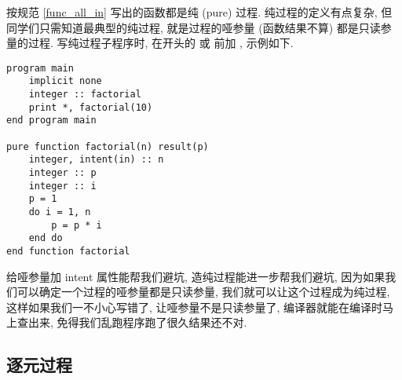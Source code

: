 按规范 \ref{func_all_in} 写出的函数都是纯 (pure) 过程. 纯过程的定义有点复杂, 但同学们只需知道最典型的纯过程, 就是过程的哑参量 (函数结果不算) 都是只读参量的过程. 写纯过程子程序时, 在开头的  或  前加 , 示例如下.
\begin{lstlisting}
program main
    implicit none
    integer :: factorial
    print *, factorial(10)
end program main

pure function factorial(n) result(p)
    integer, intent(in) :: n
    integer :: p
    integer :: i 
    p = 1
    do i = 1, n
        p = p * i
    end do
end function factorial
\end{lstlisting}
给哑参量加 intent 属性能帮我们避坑, 造纯过程能进一步帮我们避坑, 因为如果我们可以确定一个过程的哑参量都是只读参量, 我们就可以让这个过程成为纯过程, 这样如果我们一不小心写错了, 让哑参量不是只读参量了, 编译器就能在编译时马上查出来, 免得我们乱跑程序跑了很久结果还不对. 

\subsection{逐元过程}\label{elemental_procedure}

